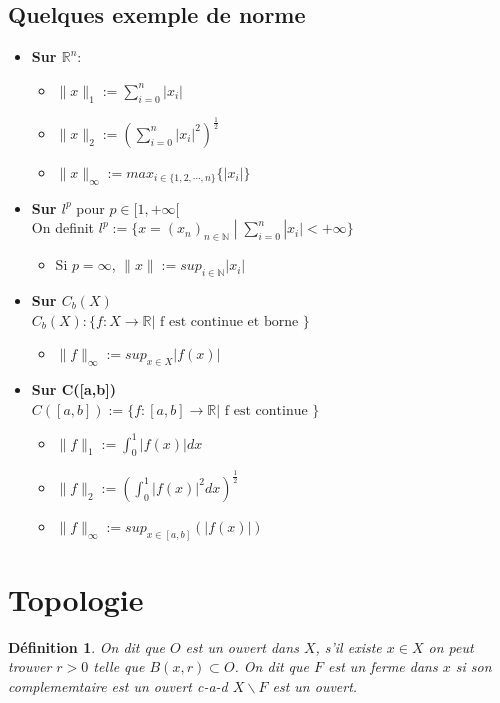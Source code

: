 \documentclass[a4paper, 12pt, french]{report}
\theoremstyle{break}
\newtheorem{defin}{Définition}[section]
\begin{document}
\subsection*{Quelques exemple de norme}
\begin{itemize}
    \item \textbf{Sur $\mathbb{R}^{n}$}:
    \begin{itemize}
        \item[.] $\|x\|_{1} := \displaystyle \sum_{i=0}^{n} |x_{i}|$
        \item[.] $\|x\|_{2} := \displaystyle (\sum_{i=0}^{n} |x_{i}|^{2})^{\frac{1}{2}}$
        \item[.] $\|x\|_{\infty} := \displaystyle max_{i \in \{1,2, \cdots, n\}} \{ |x_{i}|\}$
    \end{itemize}
    \item \textbf{Sur $l^{p}$} pour $p \in [1, +\infty[$\\
    On definit $l^{p} := \{x = (x_{n})_{n \in \mathbb{N}}\;  | \; \displaystyle \sum_{i=0}^{n} |x_{i}| < +\infty\}$ 
    \begin{itemize}
        \item[.] Si $p = \infty$, $\|x\| := sup_{i \in \mathbb{N}} |x_{i}|$
    \end{itemize}
    \item \textbf{Sur $C_{b}(X)$} \\
    $C_{b}(X) : \{f : X \rightarrow \mathbb{R} | \mbox{ f est continue et borne }\}$
    \begin{itemize}
        \item[.] $\|f\|_{\infty} := \displaystyle sup_{x \in X} {|f(x)|}$
    \end{itemize}
    \item \textbf{Sur C([a,b])} \\
    $C([a,b]) := \{ f : [a,b] \rightarrow \mathbb{R} | \mbox{ f est continue }\}$
    \begin{itemize}
        \item[.] $\|f\|_{1} := \displaystyle \int_{0}^{1} |f(x)|dx$
        \item[.] $\|f\|_{2} := \displaystyle (\int_{0}^{1} |f(x)|^{2}dx)^{\frac{1}{2}}$
        \item[.] $\|f\|_{\infty} := \displaystyle sup_{x \in [a,b]}(|f(x)|)$
    \end{itemize}
\end{itemize}

\section{Topologie}
\begin{defin}
    On dit que $O$ est un ouvert dans $X$, s'il existe $x \in X$ on peut trouver $r > 0$ telle que $B(x,r) \subset O$.
    On dit que $F$ est un ferme dans $x$ si son complememtaire est un ouvert c-a-d $X \backslash F$ est  un ouvert.
\end{defin}
\end{document}
